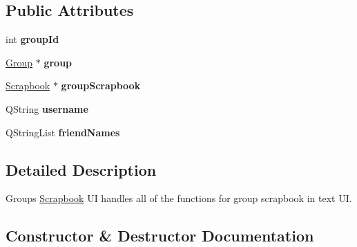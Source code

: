 \subsection*{Public Attributes}
\begin{DoxyCompactItemize}
\item 
int {\bfseries group\+Id}\hypertarget{classGroupScrapbookUI_a6d4cb2f6c2883e95e66489284512e535}{}\label{classGroupScrapbookUI_a6d4cb2f6c2883e95e66489284512e535}

\item 
\hyperlink{classGroup}{Group} $\ast$ {\bfseries group}\hypertarget{classGroupScrapbookUI_a00eef73a684700abf80579418c1ce3c2}{}\label{classGroupScrapbookUI_a00eef73a684700abf80579418c1ce3c2}

\item 
\hyperlink{classScrapbook}{Scrapbook} $\ast$ {\bfseries group\+Scrapbook}\hypertarget{classGroupScrapbookUI_a84517102b59705dc71a38c1d3bfccc7d}{}\label{classGroupScrapbookUI_a84517102b59705dc71a38c1d3bfccc7d}

\item 
Q\+String {\bfseries username}\hypertarget{classGroupScrapbookUI_a67fe7755854ad0efdf2062d7ced6ca5a}{}\label{classGroupScrapbookUI_a67fe7755854ad0efdf2062d7ced6ca5a}

\item 
Q\+String\+List {\bfseries friend\+Names}\hypertarget{classGroupScrapbookUI_a53d92693ac957d7e1ff8ee65402d3324}{}\label{classGroupScrapbookUI_a53d92693ac957d7e1ff8ee65402d3324}

\end{DoxyCompactItemize}


\subsection{Detailed Description}
Groups \hyperlink{classScrapbook}{Scrapbook} UI handles all of the functions for group scrapbook in text UI. 

\subsection{Constructor \& Destructor Documentation}
